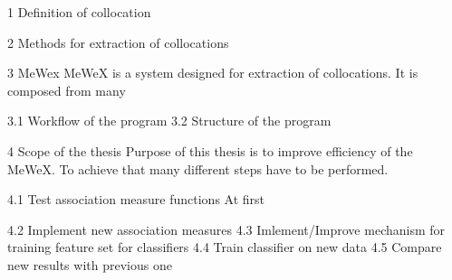 1 Definition of collocation







2 Methods for extraction of collocations


3 MeWex
MeWeX is a system designed for extraction of collocations. It is composed from many


3.1 Workflow of the program
3.2 Structure of the program


4 Scope of the thesis
Purpose of this thesis is to improve efficiency of the MeWeX. To achieve that many different steps have to be performed.


4.1 Test association measure functions
At first 

4.2 Implement new association measures
4.3 Imlement/Improve mechanism for training feature set for classifiers
4.4 Train classifier on new data
4.5 Compare new results with previous one